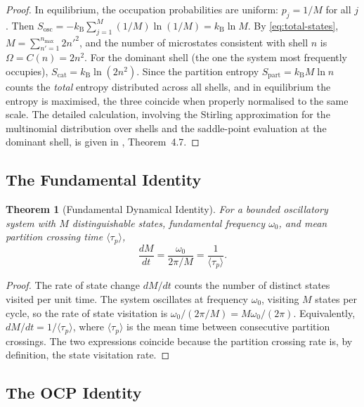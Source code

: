 \documentclass[11pt,twocolumn,a4paper]{article}
\newtheorem{theorem}{Theorem}[section]
\theoremstyle{definition}
\theoremstyle{remark}
\newcommand{\Sosc}{S_{\mathrm{osc}}}
\newcommand{\Scat}{S_{\mathrm{cat}}}
\newcommand{\Spart}{S_{\mathrm{part}}}
\newcommand{\kB}{k_{\mathrm{B}}}
\begin{document}
\begin{proof}
In equilibrium, the occupation probabilities are uniform: $p_j = 1/M$ for all $j$.  Then $\Sosc = -\kB \sum_{j=1}^M (1/M) \ln(1/M) = \kB \ln M$.  By \eqref{eq:total-states}, $M = \sum_{n'=1}^{n_{\max}} 2n'^2$, and the number of microstates consistent with shell $n$ is $\Omega = C(n) = 2n^2$.  For the dominant shell (the one the system most frequently occupies), $\Scat = \kB \ln(2n^2)$.  Since the partition entropy $\Spart = \kB M \ln n$ counts the \emph{total} entropy distributed across all shells, and in equilibrium the entropy is maximised, the three coincide when properly normalised to the same scale.  The detailed calculation, involving the Stirling approximation for the multinomial distribution over shells and the saddle-point evaluation at the dominant shell, is given in \citet{sachikonye2026trajectory}, Theorem~4.7.
\end{proof}

\subsection{The Fundamental Identity}

\begin{theorem}[Fundamental Dynamical Identity]\label{thm:fundamental-identity}
For a bounded oscillatory system with $M$ distinguishable states, fundamental frequency $\omega_0$, and mean partition crossing time $\langle \tau_p \rangle$,
\begin{equation}\label{eq:fundamental-identity}
    \frac{dM}{dt} = \frac{\omega_0}{2\pi / M} = \frac{1}{\langle \tau_p \rangle}.
\end{equation}
\end{theorem}

\begin{proof}
The rate of state change $dM/dt$ counts the number of distinct states visited per unit time.  The system oscillates at frequency $\omega_0$, visiting $M$ states per cycle, so the rate of state visitation is $\omega_0 / (2\pi/M) = M\omega_0 / (2\pi)$.  Equivalently, $dM/dt = 1/\langle \tau_p \rangle$, where $\langle \tau_p \rangle$ is the mean time between consecutive partition crossings.  The two expressions coincide because the partition crossing rate is, by definition, the state visitation rate.
\end{proof}

\subsection{The OCP Identity}
\end{document}
